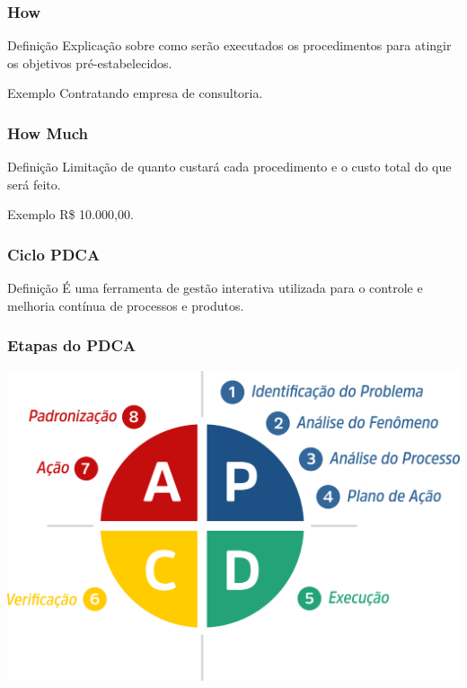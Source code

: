 \documentclass[aspectratio=169]{beamer}
\begin{document}
\begin{frame}
	\frametitle{How}

	\begin{block}{Defini\c cão}
		 Explicação sobre como serão executados os procedimentos para atingir os objetivos pré-estabelecidos.
	\end{block}\vfill
	
	\begin{exampleblock}{Exemplo}
		Contratando empresa de consultoria.
	\end{exampleblock}
\end{frame}

\begin{frame}
	\frametitle{How Much}

	\begin{block}{Defini\c cão}
		 Limitação de quanto custará cada procedimento e o custo total do que será feito.
	\end{block}\vfill
	
	\begin{exampleblock}{Exemplo}
		R\$ 10.000,00.
	\end{exampleblock}
\end{frame}

\begin{frame}
	\frametitle{Ciclo PDCA}

	\begin{block}{Defini\c cão}
		 É uma ferramenta de gestão interativa utilizada para o controle e melhoria contínua de processos e produtos.
	\end{block}
\end{frame}

\begin{frame}
	\frametitle{Etapas do PDCA}
	
	\begin{center}
		\includegraphics[scale=0.15]{img/pdca}
	\end{center}
\end{frame}
\end{document}
